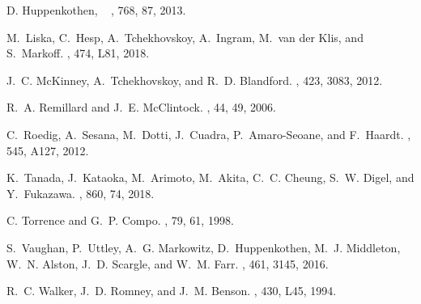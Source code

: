 \documentclass{iau}
\begin{document}
\begin{thebibliography}{}
D. Huppenkothen, \etal\
\newblock {\em \apj}, 768, 87, 2013.

M.~{Liska}, C.~{Hesp}, A.~{Tchekhovskoy}, A.~{Ingram}, M.~{van der Klis}, and
  S.~{Markoff}.
\newblock {\em \mnras}, 474, L81, 2018.

J.~C. {McKinney}, A.~{Tchekhovskoy}, and R.~D. {Blandford}.
\newblock {\em \mnras}, 423, 3083, 2012.

R.~A. {Remillard} and J.~E. {McClintock}.
\newblock {\em \araa}, 44, 49, 2006.

C.~{Roedig}, A.~{Sesana}, M.~{Dotti}, J.~{Cuadra}, P.~{Amaro-Seoane}, and
  F.~{Haardt}.
\newblock {\em \aap}, 545, A127, 2012.

K.~{Tanada}, J.~{Kataoka}, M.~{Arimoto}, M.~{Akita}, C.~C. {Cheung}, S.~W.
  {Digel}, and Y.~{Fukazawa}.
\newblock {\em \apj}, 860, 74, 2018.

C. Torrence and G.~P. Compo.
, 79, 61, 1998.

S.~{Vaughan}, P.~{Uttley}, A.~G. {Markowitz}, D.~{Huppenkothen}, M.~J.
  {Middleton}, W.~N. {Alston}, J.~D. {Scargle}, and W.~M. {Farr}.
\newblock {\em \mnras}, 461, 3145, 2016.

R.~C. {Walker}, J.~D. {Romney}, and J.~M. {Benson}.
\newblock {\em \apjl}, 430, L45, 1994.

\end{thebibliography}
\end{document}
